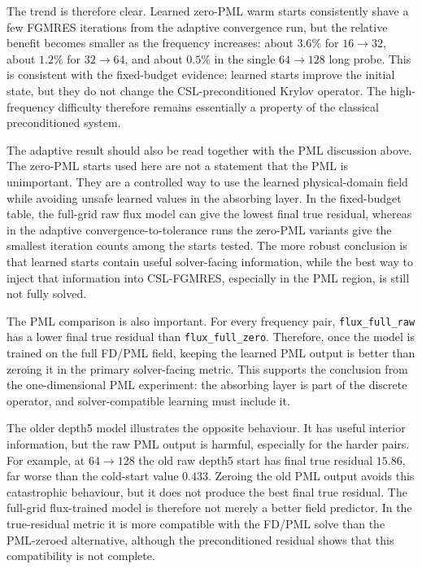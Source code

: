 The trend is therefore clear. Learned zero-PML warm starts consistently shave
a few FGMRES iterations from the adaptive convergence run, but the relative
benefit becomes smaller as the frequency increases: about $3.6\%$ for
$16\to32$, about $1.2\%$ for $32\to64$, and about $0.5\%$ in the single
$64\to128$ long probe. This is consistent with the fixed-budget evidence:
learned starts improve the initial state, but they do not change the
CSL-preconditioned Krylov operator. The high-frequency difficulty therefore
remains essentially a property of the classical preconditioned system.

The adaptive result should also be read together with the PML discussion
above. The zero-PML starts used here are not a statement that the PML is
unimportant. They are a controlled way to use the learned physical-domain
field while avoiding unsafe learned values in the absorbing layer. In the
fixed-budget table, the full-grid raw flux model can give the lowest final
true residual, whereas in the adaptive convergence-to-tolerance runs the
zero-PML variants give the smallest iteration counts among the starts tested.
The more robust conclusion is that learned starts contain useful
solver-facing information, while the best way to inject that information into
CSL-FGMRES, especially in the PML region, is still not fully solved.

The PML comparison is also important. For every frequency pair,
\texttt{flux\_full\_raw} has a lower final true residual than
\texttt{flux\_full\_zero}. Therefore, once the model is trained on the full
FD/PML field, keeping the learned PML output is better than zeroing it in the
primary solver-facing metric. This supports the conclusion from the
one-dimensional PML experiment: the absorbing layer is part of the discrete
operator, and solver-compatible learning must include it.

The older depth5 model illustrates the opposite behaviour. It has useful
interior information, but the raw PML output is harmful, especially for the
harder pairs. For example, at $64\to128$ the old raw depth5 start has final
true residual $15.86$, far worse than the cold-start value $0.433$. Zeroing
the old PML output avoids this catastrophic behaviour, but it does not produce
the best final true residual. The full-grid flux-trained model is therefore
not merely a better field predictor. In the true-residual metric it is more
compatible with the FD/PML solve than the PML-zeroed alternative, although the
preconditioned residual shows that this compatibility is not complete.

